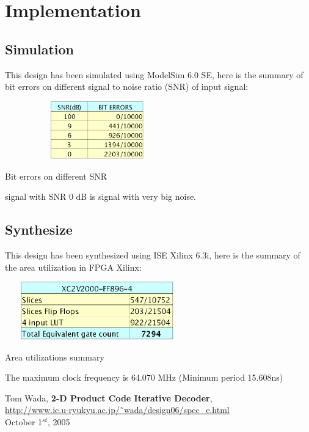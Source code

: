 \documentclass[a4paper,12pt]{report}
\begin{document}
\chapter{Implementation}

\vspace{2cm}
\section{Simulation}

This design has been simulated using ModelSim 6.0 SE, here is the
summary of bit errors on different signal to noise ratio (SNR) of input
signal:

\begin{table}[H]
\center
\includegraphics[width=8cm,height=2.5cm]{bit_errors.eps}
\caption{Bit errors on different SNR}
\label{bit_errors}
\end{table}

signal with SNR 0 dB is signal with very big noise.

\section{Synthesize}

This design has been synthesized using ISE Xilinx 6.3i, here is the
summary of the area utilization in FPGA Xilinx:

\begin{table}[H]
\center
\includegraphics[width=8cm,height=2.5cm]{area.eps}
\caption{Area utilizations summary}
\label{area}
\end{table}

The maximum clock frequency is 64.070 MHz (Minimum period 15.608ns)

\begin{thebibliography}{1}

Tom Wada, \textbf{2-D Product Code Iterative Decoder},\\
\href{http://www.ie.u-ryukyu.ac.jp/\~\ wada/design06/spec\_e.html}
     {http://www.ie.u-ryukyu.ac.jp/\~\ wada/design06/spec\_e.html}\\
     October 1$^{st}$, 2005

\end{thebibliography}
\end{document}
